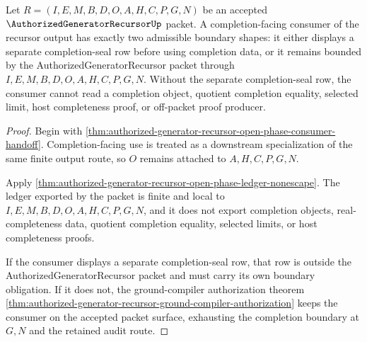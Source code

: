 \begin{theorem}
\label{thm:authorized-generator-recursor-completion-boundary-exhaustion}
Let $R=(I,E,M,B,D,O,A,H,C,P,G,N)$ be an accepted $\AuthorizedGeneratorRecursorUp$ packet. A completion-facing consumer of the recursor output has exactly two admissible boundary shapes: it either displays a separate completion-seal row before using completion data, or it remains bounded by the AuthorizedGeneratorRecursor packet through $I,E,M,B,D,O,A,H,C,P,G,N$. Without the separate completion-seal row, the consumer cannot read a completion object, quotient completion equality, selected limit, host completeness proof, or off-packet proof producer.
\end{theorem}
\begin{proof}
Begin with \autoref{thm:authorized-generator-recursor-open-phase-consumer-handoff}. Completion-facing use is treated as a downstream specialization of the same finite output route, so $O$ remains attached to $A,H,C,P,G,N$.

Apply \autoref{thm:authorized-generator-recursor-open-phase-ledger-nonescape}. The ledger exported by the packet is finite and local to $I,E,M,B,D,O,A,H,C,P,G,N$, and it does not export completion objects, real-completeness data, quotient completion equality, selected limits, or host completeness proofs.

If the consumer displays a separate completion-seal row, that row is outside the AuthorizedGeneratorRecursor packet and must carry its own boundary obligation. If it does not, the ground-compiler authorization theorem \autoref{thm:authorized-generator-recursor-ground-compiler-authorization} keeps the consumer on the accepted packet surface, exhausting the completion boundary at $G,N$ and the retained audit route.
\end{proof}


